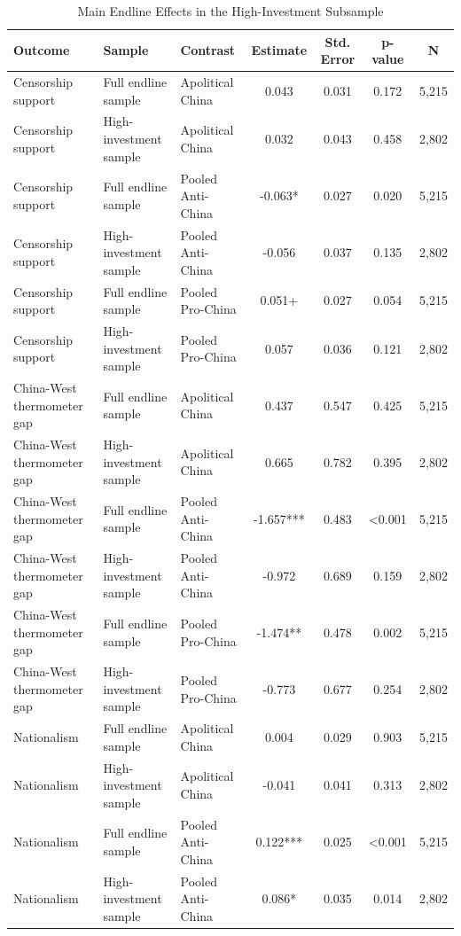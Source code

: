 \begin{table}[H]
\centering
\caption{Main Endline Effects in the High-Investment Subsample}
\label{tab:high_investment_robustness_t1}
\footnotesize
\begin{threeparttable}
\begin{tabular}{lllcccc}
\toprule
Outcome & Sample & Contrast & Estimate & Std. Error & p-value & N \\
\midrule
Censorship support & Full endline sample & Apolitical China & 0.043 & 0.031 & 0.172 & 5,215 \\
Censorship support & High-investment sample & Apolitical China & 0.032 & 0.043 & 0.458 & 2,802 \\
Censorship support & Full endline sample & Pooled Anti-China & -0.063* & 0.027 & 0.020 & 5,215 \\
Censorship support & High-investment sample & Pooled Anti-China & -0.056 & 0.037 & 0.135 & 2,802 \\
Censorship support & Full endline sample & Pooled Pro-China & 0.051+ & 0.027 & 0.054 & 5,215 \\
Censorship support & High-investment sample & Pooled Pro-China & 0.057 & 0.036 & 0.121 & 2,802 \\
China-West thermometer gap & Full endline sample & Apolitical China & 0.437 & 0.547 & 0.425 & 5,215 \\
China-West thermometer gap & High-investment sample & Apolitical China & 0.665 & 0.782 & 0.395 & 2,802 \\
China-West thermometer gap & Full endline sample & Pooled Anti-China & -1.657*** & 0.483 & <0.001 & 5,215 \\
China-West thermometer gap & High-investment sample & Pooled Anti-China & -0.972 & 0.689 & 0.159 & 2,802 \\
China-West thermometer gap & Full endline sample & Pooled Pro-China & -1.474** & 0.478 & 0.002 & 5,215 \\
China-West thermometer gap & High-investment sample & Pooled Pro-China & -0.773 & 0.677 & 0.254 & 2,802 \\
Nationalism & Full endline sample & Apolitical China & 0.004 & 0.029 & 0.903 & 5,215 \\
Nationalism & High-investment sample & Apolitical China & -0.041 & 0.041 & 0.313 & 2,802 \\
Nationalism & Full endline sample & Pooled Anti-China & 0.122*** & 0.025 & <0.001 & 5,215 \\
Nationalism & High-investment sample & Pooled Anti-China & 0.086* & 0.035 & 0.014 & 2,802 \\

\end{tabular}
\end{threeparttable}
\end{table}

